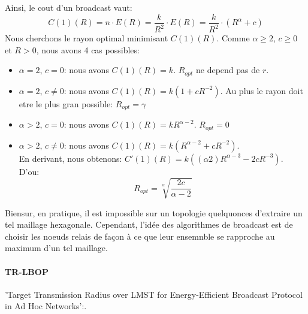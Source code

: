 Ainsi, le cout d'un broadcast vaut: $$C(1)(R)= n\cdot E(R)=\frac{k}{R^2}\cdot E(R)=\frac{k}{R^2}\cdot (R^\alpha+c)$$
Nous cherchons le rayon optimal minimisant $C(1)(R)$. Comme $\alpha\geq 2$, $c\geq 0$ et $R>0$, nous avons 4 cas possibles:
\begin{itemize}
 \item $\alpha=2$, $c=0$: nous avons $C(1)(R)=k$. $R_{opt}$ ne depend pas de $r$.
 \item $\alpha=2$, $c\neq0$: nous avons $C(1)(R)=k(1+cR^{-2})$. Au plus le rayon doit etre le plus gran possible: $R_{opt}=\gamma$
 \item $\alpha>2$, $c=0$: nous avons $C(1)(R)=kR^{\alpha-2}$. $R_{opt}=0$
 \item $\alpha>2$, $c\neq 0$: nous avons $C(1)(R)=k(R^{\alpha-2} + c R^{-2} ) $.\\
 En derivant, nous obtenons: $C'(1)(R)= k( (\alpha 2) R^{\alpha-3}- 2cR^{-3} ) $.\\
D'ou: $$R_{opt}=\sqrt[\alpha]{\frac{2c}{\alpha-2}}$$
\end{itemize}

Biensur, en pratique, il est impossible sur un topologie quelquonces d'extraire un tel maillage hexagonale. Cependant, l'idée des algorithmes de broadcast est de choisir les noeuds relais de façon à ce que leur ensemnble se rapproche 
au maximum d'un tel maillage.

\paragraph{TR-LBOP}
'Target Transmission Radius over LMST for Energy-Efficient Broadcast Protocol in Ad Hoc Networks':\cite{Ingelrest2004}.\\









